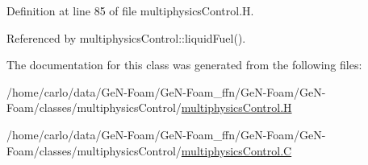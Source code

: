 Definition at line 85 of file multiphysics\+Control.\+H.



Referenced by multiphysics\+Control\+::liquid\+Fuel().



The documentation for this class was generated from the following files\+:\begin{DoxyCompactItemize}
\item 
/home/carlo/data/\+Ge\+N-\/\+Foam/\+Ge\+N-\/\+Foam\+\_\+ffn/\+Ge\+N-\/\+Foam/\+Ge\+N-\/\+Foam/classes/multiphysics\+Control/\hyperlink{multiphysicsControl_8H}{multiphysics\+Control.\+H}\item 
/home/carlo/data/\+Ge\+N-\/\+Foam/\+Ge\+N-\/\+Foam\+\_\+ffn/\+Ge\+N-\/\+Foam/\+Ge\+N-\/\+Foam/classes/multiphysics\+Control/\hyperlink{multiphysicsControl_8C}{multiphysics\+Control.\+C}\end{DoxyCompactItemize}
